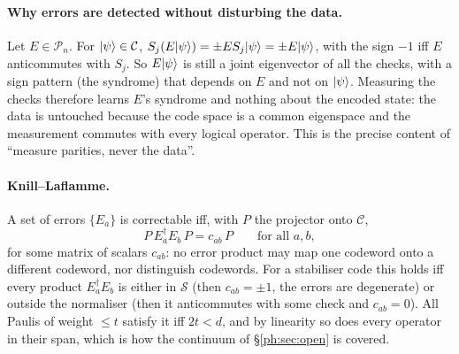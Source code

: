\paragraph{Why errors are detected without disturbing the data.} Let $E\in\mathcal P_n$. For
$\lvert \psi \rangle\in\mathcal C$, $S_j(E\lvert \psi \rangle)=\pm E S_j\lvert \psi \rangle=\pm E\lvert \psi \rangle$, with the sign
$-1$ iff $E$ anticommutes with $S_j$. So $E\lvert \psi \rangle$ is still a joint eigenvector of all the
checks, with a sign pattern (the syndrome) that depends on $E$ and not on $\lvert \psi \rangle$. Measuring
the checks therefore learns $E$'s syndrome and nothing about the encoded state: the data is
untouched because the code space is a common eigenspace and the measurement commutes with every
logical operator. This is the precise content of ``measure parities, never the data''.

\paragraph{Knill--Laflamme.} A set of errors $\{E_a\}$ is correctable iff, with $P$ the
projector onto $\mathcal C$,
\[ P\,E_a^\dagger E_b\,P=c_{ab}\,P\qquad\text{for all }a,b , \]
for some matrix of scalars $c_{ab}$: no error product may map one codeword onto a different
codeword, nor distinguish codewords. For a stabiliser code this holds iff every product
$E_a^\dagger E_b$ is either in $\mathcal S$ (then $c_{ab}=\pm1$, the errors are degenerate) or
outside the normaliser (then it anticommutes with some check and $c_{ab}=0$). All Paulis of weight
$\le t$ satisfy it iff $2t<d$, and by linearity so does every operator in their span, which is
how the continuum of \S\ref{ph:sec:open} is covered.

